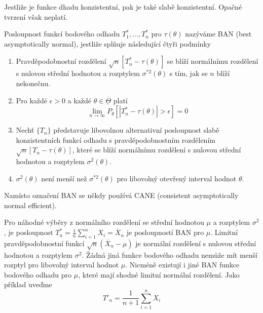 Jestliže je funkce dhadu konzistentní, pak je také slabě konzistentní. Opačné tvrzení však neplatí.

\begin{definition}
Posloupnost funkcí bodového odhadu $T_1^*, ..., T_n^*$ pro $\tau(\theta)$ nazýváme BAN (best asymptotically normal), jestliže splňuje následující čtyři podmínky
\begin{enumerate}
\item Pravděpodobnostní rozdělení $\sqrt{n}[T_n^* - \tau(\theta)]$ se blíží normálnímu rozdělení s nulovou střední hodnotou a rozptylem $\sigma^{*2}(\theta)$ s tím, jak se $n$ blíží nekonečnu.
\item Pro každé $\epsilon > 0$ a každé $\theta \in \overline{\underline{\Theta}}$ platí
\begin{equation*}
\lim_{n \rightarrow \infty} P_{\theta}[|T^*_n - \tau(\theta)| > \epsilon] = 0
\end{equation*}
\item Nechť $\{T_n\}$ představuje libovolnou alternativní posloupnost slabě konzistentních funkcí odhadu s pravděpodobnostním rozdělením $\sqrt{n}[T_n - \tau(\theta)]$, které se blíží normálnímu rozdělení s nulovou střední hodnotou a rozptylem $\sigma^2(\theta)$.
\item $\sigma^2(\theta)$ není menší než $\sigma^{*2}(\theta)$ pro libovolný otevřený interval hodnot $\theta$.
\end{enumerate} 
\end{definition}

Namísto označení BAN se někdy používá CANE (consistent asymptotically normal efficient).

\begin{example}
Pro náhodné výběry z normálního rozdělení se střední hodnotou $\mu$ a rozptylem $\sigma^2$, je posloupnost $T^*_n = \frac{1}{n} \sum_{i = 1}^n X_i = \overline{X}_n$ je posloupností BAN pro $\mu$. Limitní pravděpodobnostní funkcí $\sqrt{n}(\overline{X}_n - \mu)$ je normální rozdělení s nulovou střední hodnotou a rozptylem $\sigma^2$. Žádná jiná funkce bodového odhadu nemůže mít menší rozptyl pro libovolný interval hodnot $\mu$. Nicméně existují i jiné BAN funkce bodového odhadu pro $\mu$, které mají shodné limitní normální rozdělení. Jako příklad uveďme
\begin{equation*}
T'_n = \frac{1}{n + 1} \sum_{i = 1}^n X_i
\end{equation*}
\end{example}

